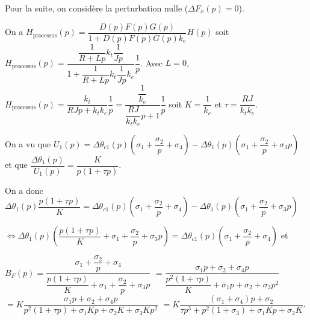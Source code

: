 \ifprof
\else
Pour la suite, on considère la perturbation nulle ($\Delta F_x(p)=0$).
\fi

\ifprof
\begin{corrige}
On a $H_{\text{processus}}(p)= \dfrac{D(p)F(p)G(p)}{1+D(p)F(p)G(p) k_e} H(p)$
soit $H_{\text{processus}}(p)= \dfrac{\dfrac{1}{R+Lp}k_t\dfrac{1}{Jp}}{1+\dfrac{1}{R+Lp}k_t\dfrac{1}{Jp} k_e} \dfrac{1}{p}$.
Avec $L=0$, 
$H_{\text{processus}}(p) =\dfrac{k_t}{RJp+k_t k_e} \dfrac{1}{p}=\dfrac{\dfrac{1}{k_e}}{\dfrac{RJ}{k_t k_e}p+1} \dfrac{1}{p}$ soit $K = \dfrac{1}{k_e}$ et $\tau = \dfrac{RJ}{k_t k_e}$.
\end{corrige}
\else
\fi



\ifprof
\begin{corrige}
On a vu que $U_1(p)= \Delta \theta_{c1}(p) \left(\sigma_1 + \dfrac{\sigma_2}{p} +\sigma_4\right) -\Delta \theta_1(p) \left(\sigma_1 + \dfrac{\sigma_2}{p} + \sigma_3p\right)$ et 
que $\dfrac{\Delta \theta_1(p)}{U_1(p)}=\dfrac{K}{p\left(1+\tau p \right)}$.

On a donc 
$\Delta \theta_1(p) \dfrac{p\left(1+\tau p \right)}{K}= \Delta \theta_{c1}(p) \left(\sigma_1 + \dfrac{\sigma_2}{p} +\sigma_4\right) -\Delta \theta_1(p) \left(\sigma_1 + \dfrac{\sigma_2}{p} + \sigma_3p\right)$

$\Leftrightarrow \Delta \theta_1(p) \left(\dfrac{p\left(1+\tau p \right)}{K}  + \sigma_1 + \dfrac{\sigma_2}{p} + \sigma_3p\right)= \Delta \theta_{c1}(p) \left(\sigma_1 + \dfrac{\sigma_2}{p} +\sigma_4\right) $ et 

$B_F(p) = \dfrac{\sigma_1 + \dfrac{\sigma_2}{p} +\sigma_4}{\dfrac{p\left(1+\tau p \right)}{K}  + \sigma_1 + \dfrac{\sigma_2}{p} + \sigma_3p}$ 
$= \dfrac{\sigma_1 p + \sigma_2 + \sigma_4 p}{\dfrac{p^2\left(1+\tau p \right)}{K}  + \sigma_1p + \sigma_2 + \sigma_3p^2}$
$= K \dfrac{\sigma_1 p + \sigma_2 + \sigma_4 p}{p^2\left(1+\tau p \right)  + \sigma_1 K p + \sigma_2 K  + \sigma_3 Kp^2}$
$= K \dfrac{\left(\sigma_1+ \sigma_4 \right) p + \sigma_2 }{ \tau p^3 + p^2\left(1+\sigma_3 \right)  + \sigma_1 K p + \sigma_2 K  }$.
\end{corrige}
\else
\fi



